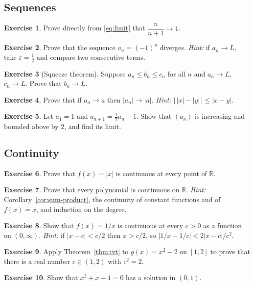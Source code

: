 \documentclass[11pt,a4paper]{book}
\newcommand{\R}{\mathbb{R}}
\newcommand{\abs}[1]{\left|#1\right|}
\numberwithin{equation}{section}          %
\theoremstyle{plain}
\theoremstyle{definition}
\newtheorem{exercise}{Exercise}[chapter]  %
\theoremstyle{remark}
\begin{document}
\subsection*{Sequences}

\begin{exercise}
Prove directly from \eqref{eq:limit} that $\dfrac{n}{n+1}\to1$.
\end{exercise}

\begin{exercise}
Prove that the sequence $a_n=(-1)^n$ diverges. \emph{Hint:} if $a_n\to L$, take $\varepsilon=\tfrac12$ and compare two consecutive terms.
\end{exercise}

\begin{exercise}[Squeeze theorem]
Suppose $a_n\le b_n\le c_n$ for all $n$ and $a_n\to L$, $c_n\to L$. Prove that $b_n\to L$.
\end{exercise}

\begin{exercise}
Prove that if $a_n\to a$ then $\abs{a_n}\to\abs a$. \emph{Hint:} $\bigl|\,\abs x-\abs y\,\bigr|\le\abs{x-y}$.
\end{exercise}

\begin{exercise}
Let $a_1=1$ and $a_{n+1}=\tfrac12a_n+1$. Show that $(a_n)$ is increasing and bounded above by $2$, and find its limit.
\end{exercise}

\subsection*{Continuity}

\begin{exercise}
Prove that $f(x)=\abs x$ is continuous at every point of $\R$.
\end{exercise}

\begin{exercise}
Prove that every polynomial is continuous on $\R$. \emph{Hint:} Corollary~\ref{cor:sum-product}, the continuity of constant functions and of $f(x)=x$, and induction on the degree.
\end{exercise}

\begin{exercise}
Show that $f(x)=1/x$ is continuous at every $c>0$ as a function on $(0,\infty)$. \emph{Hint:} if $\abs{x-c}<c/2$ then $x>c/2$, so $\abs{1/x-1/c}<2\abs{x-c}/c^2$.
\end{exercise}

\begin{exercise}\label{ex:sqrt2-exists}
Apply Theorem~\ref{thm:ivt} to $g(x)=x^2-2$ on $[1,2]$ to prove that there is a real number $c\in(1,2)$ with $c^2=2$.
\end{exercise}

\begin{exercise}
Show that $x^3+x-1=0$ has a solution in $(0,1)$.
\end{exercise}

\backmatter


\end{document}
